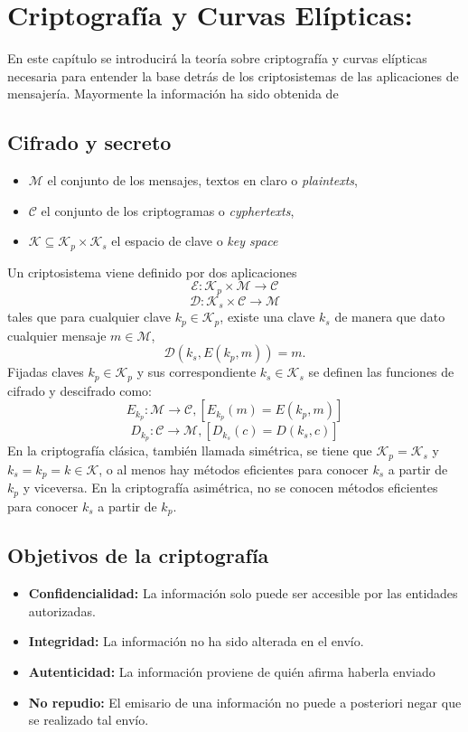 \chapter{Criptografía y Curvas Elípticas:}

En este capítulo se introducirá la teoría sobre criptografía y curvas elípticas necesaria para entender la base detrás de los criptosistemas de las aplicaciones de mensajería.
Mayormente la información ha sido obtenida de \cite{GomezPardo2002b}

\section{Cifrado y secreto}

\begin{itemize}
	\item $\mathcal{M}$ el conjunto de los mensajes, textos en claro o \emph{plaintexts},
	\item $\mathcal{C}$ el conjunto de los criptogramas o \emph{cyphertexts},
	\item $\mathcal{K} \subseteq \mathcal{K}_p\times\mathcal{K}_s$ el espacio de clave o \emph{key space}
\end{itemize}
Un criptosistema viene definido por dos aplicaciones
$$\mathcal{E}:\mathcal{K}_p\times\mathcal{M}\rightarrow\mathcal{C}$$
$$\mathcal{D}:\mathcal{K}_s\times\mathcal{C}\rightarrow\mathcal{M}$$
tales que para cualquier clave $k_p \in \mathcal{K}_p$, existe una clave $k_s$ de manera que dato cualquier mensaje $m \in \mathcal{M}$,
$$
\mathcal{D}(k_s,E(k_p,m))=m.
$$
Fijadas claves $k_p \in \mathcal{K}_p$ y sus correspondiente $k_s \in \mathcal{K}_s$ se definen las funciones de cifrado y descifrado como:
$$
	E_{k_p}:\mathcal{M}\rightarrow\mathcal{C},[E_{k_p}(m)=E(k_p,m)]
$$
$$
	D_{k_p}:\mathcal{C}\rightarrow\mathcal{M},[D_{k_s}(c)=D(k_s,c)]
$$
En la criptografía clásica, también llamada simétrica, se tiene que $\mathcal{K}_p=\mathcal{K}_s$ y $k_s = k_p = k \in \mathcal{K}$, o al menos hay métodos eficientes para conocer $k_s$ a partir de $k_p$ y viceversa. En la criptografía asimétrica, no se conocen métodos eficientes para conocer $k_s$ a partir de $k_p$.

\section{Objetivos de la criptografía}
\begin{itemize}
		\item \textbf{Confidencialidad:} La información solo puede ser accesible por las entidades autorizadas. 
		\item \textbf{Integridad:} La información no ha sido alterada en el envío.
		\item \textbf{Autenticidad:} La información proviene de quién afirma haberla enviado
		\item \textbf{No repudio:} El emisario de una información no puede a posteriori negar que se realizado tal envío.
\end{itemize}
